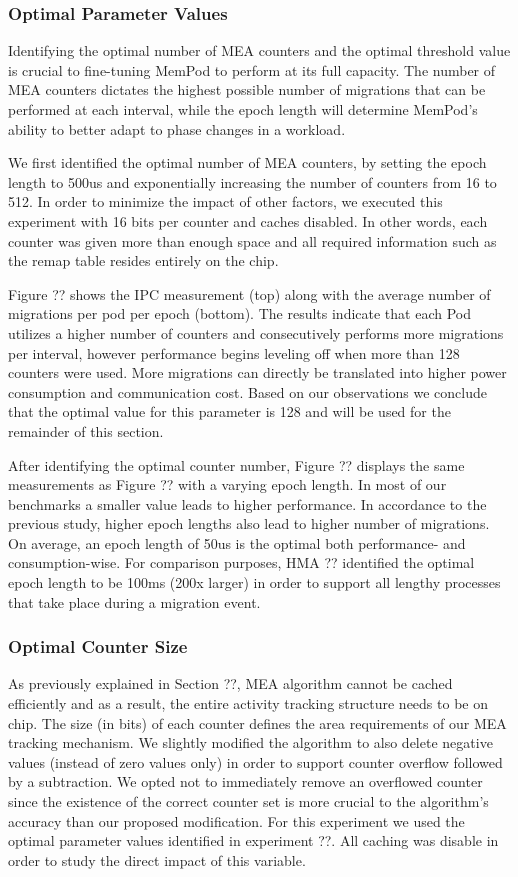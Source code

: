 \subsubsection{Optimal Parameter Values}
Identifying the optimal number of MEA counters and the optimal threshold value is crucial to fine-tuning MemPod to perform at its full capacity. The number of MEA counters dictates the highest possible number of migrations that can be performed at each interval, while the epoch length will determine MemPod's ability to better adapt to phase changes in a workload.

We first identified the optimal number of MEA counters, by setting the epoch length to 500us and exponentially increasing the number of counters from 16 to 512. In order to minimize the impact of other factors, we executed this experiment with 16 bits per counter and caches disabled. In other words, each counter was given more than enough space and all required information such as the remap table resides entirely on the chip. 

Figure ?? shows the IPC measurement (top) along with the average number of migrations per pod per epoch (bottom). The results indicate that each Pod utilizes a higher number of counters and consecutively performs more migrations per interval, however performance begins leveling off when more than 128 counters were used. More migrations can directly be translated into higher power consumption and communication cost. Based on our observations we conclude that the optimal value for this parameter is 128 and will be used for the remainder of this section.

After identifying the optimal counter number, Figure ?? displays the same measurements as Figure ?? with a varying epoch length. In most of our benchmarks a smaller value leads to higher performance. In accordance to the previous study, higher epoch lengths also lead to higher number of migrations. On average, an epoch length of 50us is the optimal both performance- and consumption-wise. For comparison purposes, HMA ?? identified the optimal epoch length to be 100ms (200x larger) in order to support all lengthy processes that take place during a migration event.

\subsubsection{Optimal Counter Size}

As previously explained in Section ??, MEA algorithm cannot be cached efficiently and as a result, the entire activity tracking structure needs to be on chip. The size (in bits) of each counter defines the area requirements of our MEA tracking mechanism. We slightly modified the algorithm to also delete negative values (instead of zero values only) in order to support counter overflow followed by a subtraction. We opted not to immediately remove an overflowed counter since the existence of the correct counter set is more crucial to the algorithm's accuracy than our proposed modification. For this experiment we used the optimal parameter values identified in experiment ??. All caching was disable in order to study the direct impact of this variable.

